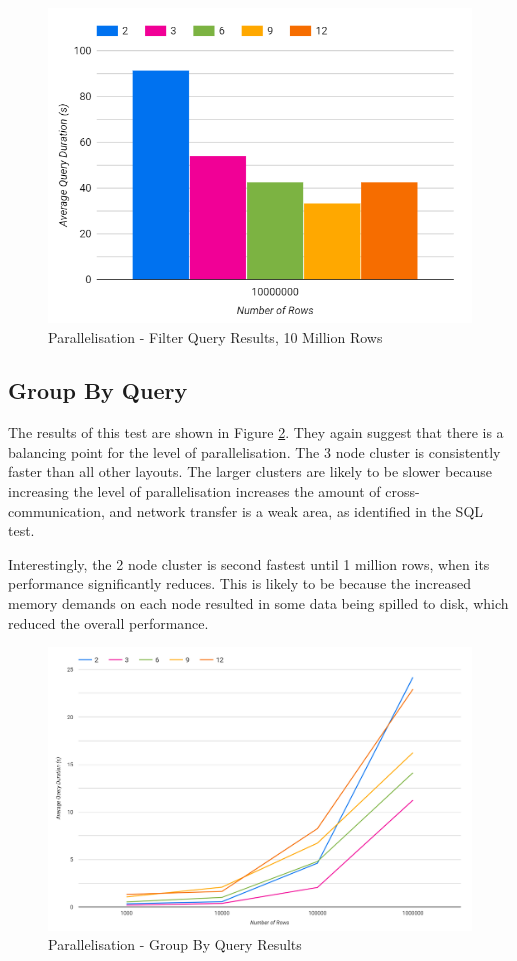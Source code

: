 \begin{figure}[ht]
	\centering
	\includegraphics[width=0.4\linewidth]{chapters/diagrams/testing/filter-simple-parallelisation-10m}
	\caption{Parallelisation - Filter Query Results, 10 Million Rows}
	\label{fig:filter-simple-parallelisation-10m}
\end{figure}

\subsection{Group By Query}
The results of this test are shown in Figure \ref{fig:group-by-simple-parallelisation-test}. They again suggest that there is a balancing point for the level of parallelisation. The 3 node cluster is consistently faster than all other layouts. The larger clusters are likely to be slower because increasing the level of parallelisation increases the amount of cross-communication, and network transfer is a weak area, as identified in the SQL test. 

Interestingly, the 2 node cluster is second fastest until 1 million rows, when its performance significantly reduces. This is likely to be because the increased memory demands on each node resulted in some data being spilled to disk, which reduced the overall performance.

\begin{figure}[ht]
	\centering
	\includegraphics[width=0.8\linewidth]{chapters/diagrams/testing/group-by-simple-parallelisation-test}
	\caption{Parallelisation - Group By Query Results}
	\label{fig:group-by-simple-parallelisation-test}
\end{figure}

